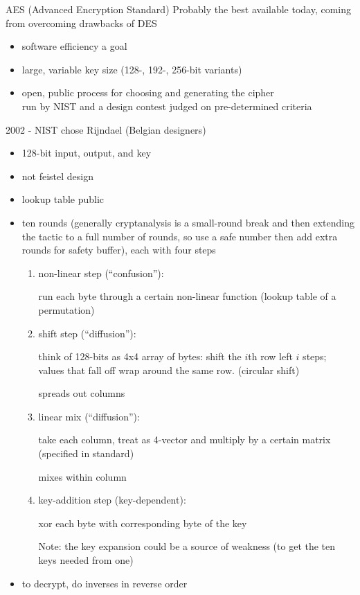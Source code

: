 \begin{example}{AES (Advanced Encryption Standard)}
    Probably the best available today, coming from overcoming drawbacks of DES
    \begin{itemize}
        \item software efficiency a goal
        \item large, variable key size (128-, 192-, 256-bit variants)
        \item open, public process for choosing and generating the cipher\\
            run by NIST and a design contest judged on pre-determined criteria
    \end{itemize}

    2002 - NIST chose Rijndael (Belgian designers)
\end{example}

\begin{itemize}
    \item 128-bit input, output, and key
    \item not feistel design
    \item lookup table public

    \item ten rounds (generally cryptanalysis is a small-round break and then
            extending the tactic to a full number of rounds, so use a safe
            number then add extra rounds for safety buffer), each with four steps
        \begin{enumerate}
            \item non-linear step (``confusion''):

                run each byte through a certain non-linear function (lookup
                table of a permutation)
            \item shift step (``diffusion''):

                think of 128-bits as 4x4 array of bytes: shift the $i$th row left $i$ steps; values that 
                fall off wrap around the same row. (circular shift)

                spreads out columns
            \item linear mix (``diffusion''):

                take each column, treat as 4-vector and multiply by a certain
                matrix (specified in standard)

                mixes within column
            \item key-addition step (key-dependent):

                xor each byte with corresponding byte of the key

                Note: the key expansion could be a source of weakness (to get
                the ten keys needed from one)
        \end{enumerate}
    \item to decrypt, do inverses in reverse order
\end{itemize}

